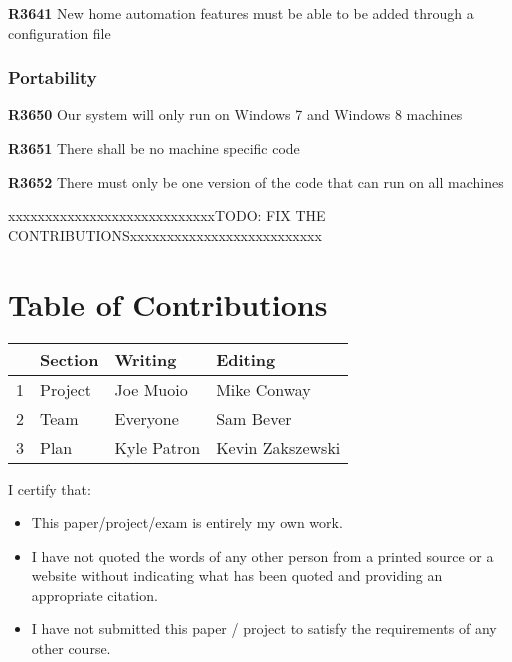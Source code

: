 \documentclass{article}
\begin{document}
\textbf{R3641} New home automation features must be able to be added through a configuration file

\subsubsection{Portability}
\textbf{R3650} Our system will only run on Windows 7 and Windows 8 machines 

\textbf{R3651} There shall be no machine specific code

\textbf{R3652} There must only be one version of the code that can run on all machines


\newpage
{\color{red}xxxxxxxxxxxxxxxxxxxxxxxxxxxxTODO: FIX THE CONTRIBUTIONSxxxxxxxxxxxxxxxxxxxxxxxxxx}
\section*{\centering Table of Contributions}
\begin{tabular}{| l | l | l | l |}
    \hline
     & Section & Writing & Editing \\
    \hline \hline
    1 & Project & Joe Muoio  & Mike Conway \\ \hline
    2 & Team & Everyone & Sam Bever \\ \hline
    3 & Plan & Kyle Patron & Kevin Zakszewski \\ \hline
\end{tabular}
\newpage
\noindent I certify that:
\begin{itemize}
\item This paper/project/exam is entirely my own work.
\item I have not quoted the words of any other person from a printed source or a website without indicating what has been quoted and providing an appropriate citation.
\item I have not submitted this paper / project to satisfy the requirements of any other course.
\end{itemize}

\vspace{1cm}
\noindent{}


\vspace{0.5cm}
\noindent{}
\end{document}
